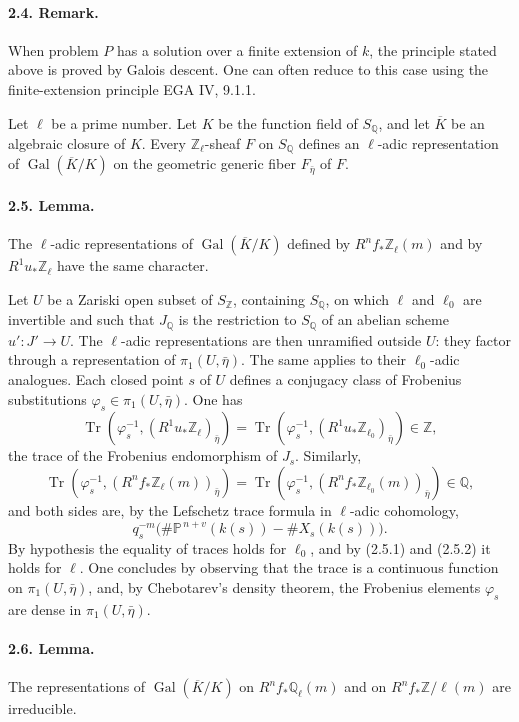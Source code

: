 \documentclass[10pt]{article}
\newcommand{\Pj}{\mathbb P}
\newcommand{\Q}{\mathbb Q}
\newcommand{\Z}{\mathbb Z}
\newcommand{\Gal}{\operatorname{Gal}}
\newcommand{\Tr}{\operatorname{Tr}}
\begin{document}
\paragraph{2.4. Remark.} When problem \(P\) has a solution over a finite extension of \(k\), the principle stated above is proved by Galois descent. One can often reduce to this case using the finite-extension principle EGA IV, 9.1.1.

Let \(\ell\) be a prime number. Let \(K\) be the function field of \(S_\Q\), and let \(\overline K\) be an algebraic closure of \(K\). Every \(\Z_\ell\)-sheaf \(F\) on \(S_\Q\) defines an \(\ell\)-adic representation of \(\Gal(\overline K/K)\) on the geometric generic fiber \(F_{\bar\eta}\) of \(F\).

\paragraph{2.5. Lemma.} The \(\ell\)-adic representations of \(\Gal(\overline K/K)\) defined by \(R^nf_*\Z_\ell(m)\) and by \(R^1u_*\Z_\ell\) have the same character.

Let \(U\) be a Zariski open subset of \(S_\Z\), containing \(S_\Q\), on which \(\ell\) and \(\ell_0\) are invertible and such that \(J_\Q\) is the restriction to \(S_\Q\) of an abelian scheme \(u':J'\to U\). The \(\ell\)-adic representations are then unramified outside \(U\): they factor through a representation of \(\pi_1(U,\bar\eta)\). The same applies to their \(\ell_0\)-adic analogues. Each closed point \(s\) of \(U\) defines a conjugacy class of Frobenius substitutions \(\varphi_s\in\pi_1(U,\bar\eta)\). One has
\[
\tag{2.5.1}
\Tr(\varphi_s^{-1},(R^1u_*\Z_\ell)_{\bar\eta})
=\Tr(\varphi_s^{-1},(R^1u_*\Z_{\ell_0})_{\bar\eta})\in\Z,
\]
the trace of the Frobenius endomorphism of \(J_s\). Similarly,
\[
\tag{2.5.2}
\Tr(\varphi_s^{-1},(R^nf_*\Z_\ell(m))_{\bar\eta})
=\Tr(\varphi_s^{-1},(R^nf_*\Z_{\ell_0}(m))_{\bar\eta})\in\Q,
\]
and both sides are, by the Lefschetz trace formula in \(\ell\)-adic cohomology,
\[
q_s^{-m}\bigl(\#\Pj^{\,n+v}(k(s))-\#X_s(k(s))\bigr).
\]
By hypothesis the equality of traces holds for \(\ell_0\), and by (2.5.1) and (2.5.2) it holds for \(\ell\). One concludes by observing that the trace is a continuous function on \(\pi_1(U,\bar\eta)\), and, by Chebotarev's density theorem, the Frobenius elements \(\varphi_s\) are dense in \(\pi_1(U,\bar\eta)\).

\paragraph{2.6. Lemma.} The representations of \(\Gal(\overline K/K)\) on \(R^nf_*\Q_\ell(m)\) and on \(R^nf_*\Z/\ell(m)\) are irreducible.
\end{document}
